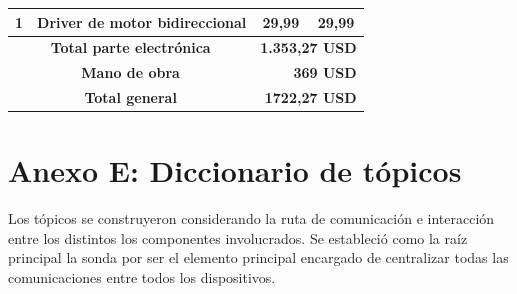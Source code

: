 \begin{appendices}
\begin{table}[t]
\begin{tabular}{clcc}
\multicolumn{1}{|c|}{1}                 & \multicolumn{1}{l|}{Driver de motor bidireccional}                      & \multicolumn{1}{c|}{29,99}              & \multicolumn{1}{c|}{29,99}              \\ \hline
\multicolumn{2}{|c|}{\textbf{Total parte electrónica}}                                                            & \multicolumn{2}{r|}{\textbf{1.353,27 USD}}                                        \\ \hline
\multicolumn{2}{|c|}{\textbf{Mano de obra}}                                                                       & \multicolumn{2}{r|}{\textbf{369 USD}}                                             \\ \hline
\multicolumn{2}{|c|}{\textbf{Total general}}                                                                      & \multicolumn{2}{r|}{\textbf{1722,27 USD}}                                         \\ \hline
\end{tabular}
\end{table}
\end{appendices}

\chapter*{Anexo E: Diccionario de t\'opicos}
\label{appendix: e}
Los t\'opicos se construyeron considerando la ruta de comunicaci\'on e interacci\'on entre los distintos los componentes involucrados. Se estableci\'o como la ra\'iz principal la sonda por ser el elemento principal encargado de centralizar todas las comunicaciones entre todos los dispositivos.

